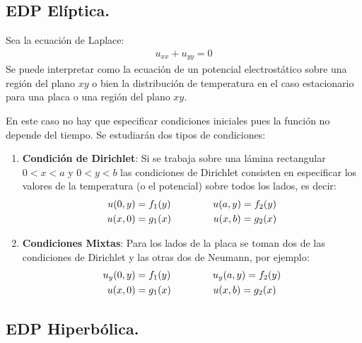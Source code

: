 \documentclass[12pt]{article}
\numberwithin{equation}{section}
\begin{document}
\subsection{EDP Elíptica.}

Sea la ecuación de Laplace:
\begin{align*}
u_{xx} + u_{yy} = 0
\end{align*}
Se puede interpretar como la ecuación de un potencial electrostático sobre una región del plano $xy$ o bien la distribución de temperatura en el caso estacionario para una placa o una región del plano $xy$.
\par
En este caso no hay que especificar condiciones iniciales pues la función no depende del tiempo. Se estudiarán dos tipos de condiciones:
\begin{enumerate}
\item \textbf{Condición de Dirichlet}: Si se trabaja sobre una lámina rectangular $0 < x < a$ y $0 < y < b$ las condiciones de Dirichlet consisten en especificar los valores de la temperatura (o el potencial) sobre todos los lados, es decir:
\begin{align}
\begin{aligned}
u (0, y) &= f_{1}(y) \hspace{1.5cm} u (a, y) = f_{2}(y) \\
u (x, 0) &= g_{1}(x) \hspace{1.5cm} u (x, b) = g_{2}(x)
\end{aligned}
\label{eq:ecuacion_06_02_05}
\end{align}
\item \textbf{Condiciones Mixtas}: Para los lados de la placa se toman dos de las condiciones de Dirichlet y las otras dos de Neumann, por ejemplo:
\begin{align}
\begin{aligned}
u_{y} (0, y) &= f_{1}(y) \hspace{1.5cm} u_{y} (a, y) = f_{2}(y) \\
u (x, 0) &= g_{1}(x) \hspace{1.5cm} u (x, b) = g_{2}(x)
\end{aligned}
\label{eq:ecuacion_06_01_06}
\end{align}
\end{enumerate}

\subsection{EDP Hiperbólica.}
\end{document}
